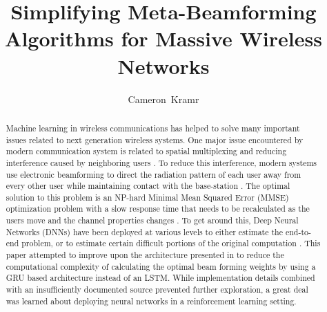 \documentclass[journal]{IEEEtran}
\begin{document}
\title{Simplifying Meta-Beamforming Algorithms for Massive Wireless Networks}

\author{Cameron~Kramr}


\maketitle

\begin{abstract}
Machine learning in wireless communications has helped to solve many important issues related to next generation wireless systems. One major issue encountered by modern communication system is related to spatial multiplexing and reducing interference caused by neighboring users \cite{Through_Max}. To reduce this interference, modern systems use electronic beamforming to direct the radiation pattern of each user away from every other user while maintaining contact with the base-station \cite{Intelligent_mMMIMO}. The optimal solution to this problem is an NP-hard Minimal Mean Squared Error (MMSE) optimization problem with a slow response time that needs to be recalculated as the users move and the channel properties changes \cite{NO_inverse_MMSE}. To get around this, Deep Neural Networks (DNNs) have been deployed at various levels to either estimate the end-to-end problem, or to estimate certain difficult portions of the original computation \cite{Review_DL_BF}. This paper attempted to improve upon the architecture presented in \cite{LSTM_Net} to reduce the computational complexity of calculating the optimal beam forming weights by using a GRU based architecture instead of an LSTM. While implementation details combined with an insufficiently documented source prevented further exploration, a great deal was learned about deploying neural networks in a reinforcement learning setting. 
\end{abstract}


\end{document}
